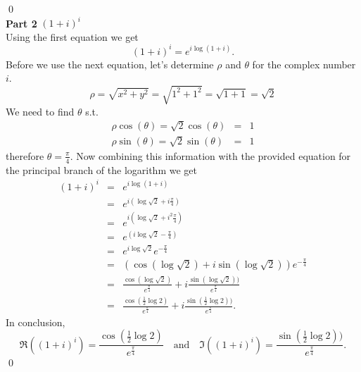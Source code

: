 \documentclass[10pt]{amsart}
\theoremstyle{nonumberplain}
\begin{document}
\begin{enumerate}[label={\bf {\arabic*}:}]
\qed \\
\textbf{Part 2} $(1 + i)^i$ \\
Using the first equation we get
$$(1 + i)^i = e^{i\log{(1 + i)}}.$$
Before we use the next equation, let's determine $\rho$ and $\theta$ for the complex number $i$.
$$\rho = \sqrt{x^2 + y^2} = \sqrt{1^2 + 1^2} = \sqrt{1 + 1} = \sqrt{2}$$
We need to find $\theta$ s.t.
\begin{eqnarray*}
\rho \cos(\theta) = \sqrt{2} \cos(\theta) &=& 1 \\
\rho \sin(\theta) = \sqrt{2} \sin(\theta) &=& 1
\end{eqnarray*}
therefore $\theta = \frac{\pi}{4}$.
Now combining this information with the provided equation for the principal branch of the logarithm we get
\begin{eqnarray*}
(1 + i)^i &=& e^{i\log{(1 + i)}} \\
    &=& e^{i(\log{\sqrt{2}}+i\frac{\pi}{4})} \\
    &=& e^{i(\log{\sqrt{2}}+i^2\frac{\pi}{4})} \\
    &=& e^{(i\log{\sqrt{2}}-\frac{\pi}{4})} \\
    &=& e^{i\log{\sqrt{2}}}e^{-\frac{\pi}{4}} \\
    &=& (\cos(\log{\sqrt{2}}) + i\sin(\log{\sqrt{2}}))e^{-\frac{\pi}{4}} \\
    &=& \frac{\cos(\log{\sqrt{2}})}{e^{\frac{\pi}{4}}} + i\frac{\sin(\log{\sqrt{2}}))}{e^{\frac{\pi}{4}}} \\
    &=& \frac{\cos(\frac{1}{2}\log{2})}{e^{\frac{\pi}{4}}} + i\frac{\sin(\frac{1}{2}\log{2}))}{e^{\frac{\pi}{4}}}.
\end{eqnarray*}
In conclusion, $$\Re{((1 + i)^i)} = \frac{\cos(\frac{1}{2}\log{2})}{e^{\frac{\pi}{4}}} \quad \text{and} \quad \Im{((1 + i)^i)} = \frac{\sin(\frac{1}{2}\log{2}))}{e^{\frac{\pi}{4}}}.$$ \qed \\



\end{enumerate}
\end{document}
